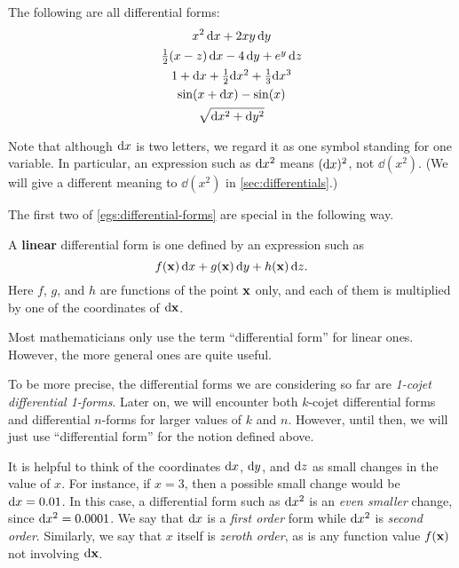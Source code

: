\documentclass[12pt]{amsart}
\begin{document}
\begin{egs}\label{egs:differential-forms}
  The following are all differential forms:
  \begin{gather*}
    x^2 \,\mathrm{d} x + 2xy \, \mathrm{d} y\\
    \textstyle\frac{1}{2}({x-z}) \,\mathrm{d} x - 4\, \mathrm{d} y + e^y \,\mathrm{d} z\\
    1 + \mathrm{d} x + \textstyle\frac{1}{2} \mathrm{d} x^2 + \textstyle\frac{1}{3} \mathrm{d} x^3\\
    \sin(x + \mathrm{d} x) - \sin(x)\\
    \sqrt{\mathrm{d} x^2+\mathrm{d} y^2}
  \end{gather*}
\end{egs}

Note that although $\mathrm{d} x$ is two letters, we regard it as one symbol standing for one variable.
In particular, an expression such as $\mathrm{d} x^2$ means $(\mathrm{d} x)^2$, not $\dd(x^2)$.
(We will give a different meaning to $\dd(x^2)$ in \cref{sec:differentials}.)

The first two of \cref{egs:differential-forms} are special in the following way.

\begin{defn}
  A \textbf{linear} differential form is one defined by an expression such as
  \[ f(\mathbf{x}) \, \mathrm{d} x + g(\mathbf{x}) \, \mathrm{d} y + h(\mathbf{x}) \, \mathrm{d} z. \]
  Here $f$, $g$, and $h$ are functions of the point $\mathbf{x}$ only, and each of them is multiplied by one of the coordinates of $\mathrm{d} \mathbf{x}$.
\end{defn}

Most mathematicians only use the term ``differential form'' for linear ones.
However, the more general ones are quite useful.

\begin{adv}
  To be more precise, the differential forms we are considering so far are \emph{1-cojet differential 1-forms}.
  Later on, we will encounter both $k$-cojet differential forms and differential $n$-forms for larger values of $k$ and $n$.
  However, until then, we will just use ``differential form'' for the notion defined above.
\end{adv}

It is helpful to think of the coordinates $\mathrm{d} x$, $\mathrm{d} y$, and $\mathrm{d} z$ as small changes in the value of $x$.
For instance, if $x=3$, then a possible small change would be $\mathrm{d} x = 0.01$.
In this case, a differential form such as $\mathrm{d} x^2$ is an \emph{even smaller} change, since $\mathrm{d} x^2 = 0.0001$.
We say that $\mathrm{d} x$ is a \emph{first order} form while $\mathrm{d} x^2$ is \emph{second order}.
Similarly, we say that $x$ itself is \emph{zeroth order}, as is any function value $f(\mathbf{x})$ not involving $\mathrm{d} \mathbf{x}$.
\end{document}
